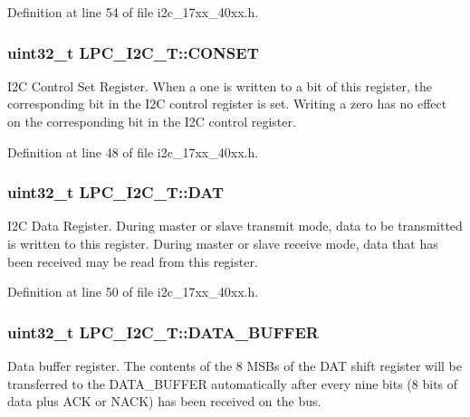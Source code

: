 Definition at line 54 of file i2c\+\_\+17xx\+\_\+40xx.\+h.

\subsubsection[{\texorpdfstring{C\+O\+N\+S\+ET}{CONSET}}]{ uint32\+\_\+t L\+P\+C\+\_\+\+I2\+C\+\_\+\+T\+::\+C\+O\+N\+S\+ET}\hypertarget{structLPC__I2C__T_a98ed6d816b3c7e00a29b32956fe5fa2d}{}\label{structLPC__I2C__T_a98ed6d816b3c7e00a29b32956fe5fa2d}
I2C Control Set Register. When a one is written to a bit of this register, the corresponding bit in the I2C control register is set. Writing a zero has no effect on the corresponding bit in the I2C control register. 

Definition at line 48 of file i2c\+\_\+17xx\+\_\+40xx.\+h.

\subsubsection[{\texorpdfstring{D\+AT}{DAT}}]{ uint32\+\_\+t L\+P\+C\+\_\+\+I2\+C\+\_\+\+T\+::\+D\+AT}\hypertarget{structLPC__I2C__T_ab3babd27c9d202c1fefce13d5498d473}{}\label{structLPC__I2C__T_ab3babd27c9d202c1fefce13d5498d473}
I2C Data Register. During master or slave transmit mode, data to be transmitted is written to this register. During master or slave receive mode, data that has been received may be read from this register. 

Definition at line 50 of file i2c\+\_\+17xx\+\_\+40xx.\+h.

\subsubsection[{\texorpdfstring{D\+A\+T\+A\+\_\+\+B\+U\+F\+F\+ER}{DATA_BUFFER}}]{ uint32\+\_\+t L\+P\+C\+\_\+\+I2\+C\+\_\+\+T\+::\+D\+A\+T\+A\+\_\+\+B\+U\+F\+F\+ER}\hypertarget{structLPC__I2C__T_a63283a528320f69703f42fcc919ab4bc}{}\label{structLPC__I2C__T_a63283a528320f69703f42fcc919ab4bc}
Data buffer register. The contents of the 8 M\+S\+Bs of the D\+AT shift register will be transferred to the D\+A\+T\+A\+\_\+\+B\+U\+F\+F\+ER automatically after every nine bits (8 bits of data plus A\+CK or N\+A\+CK) has been received on the bus. 


